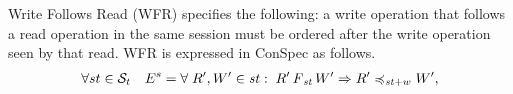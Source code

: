 \documentclass[acmlarge, ,11pt]{acmart}
\begin{document}
\par Write Follows Read (WFR) specifies the following: a write operation that follows a read operation in the same session must be ordered after the write operation seen by that read. WFR is expressed in ConSpec as follows. \\
 \begin{align}\label{eqn:WFR}
\begin{split}
\forall st \in \mathcal{S}_t \quad E^{s} =  \forall \; {R}', {W}' \in \mathit{st} : \; {R}' \operatorname{\it F}_\mathit{st} {W}'
 \Rightarrow {R}' \preccurlyeq_{\mathit{st}+w} {W}' , %

\end{split}
\end{align}
\end{document}
